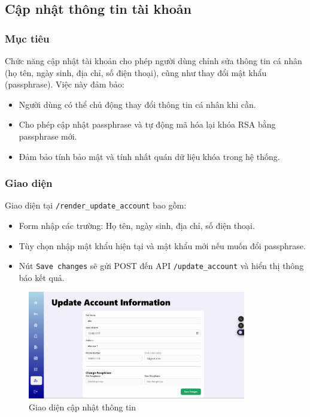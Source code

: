 \newpage
\subsection{Cập nhật thông tin tài khoản}

\subsubsection*{Mục tiêu}
Chức năng cập nhật tài khoản cho phép người dùng chỉnh sửa thông tin cá nhân (họ tên, ngày sinh, địa chỉ, số điện thoại), cũng như thay đổi mật khẩu (passphrase). Việc này đảm bảo:
\begin{itemize}
    \item Người dùng có thể chủ động thay đổi thông tin cá nhân khi cần.
    \item Cho phép cập nhật passphrase và tự động mã hóa lại khóa RSA bằng passphrase mới.
    \item Đảm bảo tính bảo mật và tính nhất quán dữ liệu khóa trong hệ thống.
\end{itemize}

\subsubsection*{Giao diện}
Giao diện tại \texttt{/render\_update\_account} bao gồm:
\begin{itemize}
    \item Form nhập các trường: Họ tên, ngày sinh, địa chỉ, số điện thoại.
    \item Tùy chọn nhập mật khẩu hiện tại và mật khẩu mới nếu muốn đổi passphrase.
    \item Nút \texttt{Save changes} sẽ gửi POST đến API \texttt{/update\_account} và hiển thị thông báo kết quả.
\end{itemize}

\begin{figure}[H]
    \centering
    \includegraphics[width=0.85\textwidth]{img/5_update/5_update_form.png}
    \caption{Giao diện cập nhật thông tin}
\end{figure}

